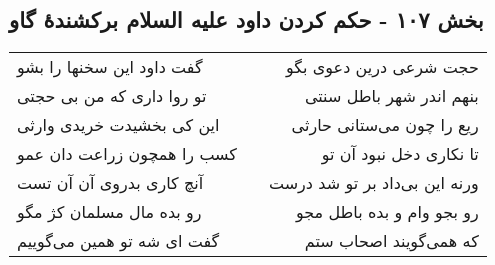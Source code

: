\begin{center}
\section*{بخش ۱۰۷ - حکم کردن داود علیه السلام برکشندهٔ گاو}
\label{sec:sh107}
\begin{longtable}{l p{0.5cm} r}
گفت داود این سخنها را بشو
&&
حجت شرعی درین دعوی بگو
\\
تو روا داری که من بی حجتی
&&
بنهم اندر شهر باطل سنتی
\\
این کی بخشیدت خریدی وارثی
&&
ریع را چون می‌ستانی حارثی
\\
کسب را همچون زراعت دان عمو
&&
تا نکاری دخل نبود آن تو
\\
آنچ کاری بدروی آن آن تست
&&
ورنه این بی‌داد بر تو شد درست
\\
رو بده مال مسلمان کژ مگو
&&
رو بجو وام و بده باطل مجو
\\
گفت ای شه تو همین می‌گوییم
&&
که همی‌گویند اصحاب ستم
\\
\end{longtable}
\end{center}
